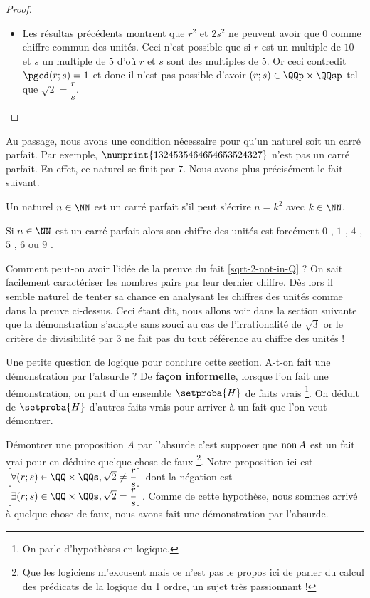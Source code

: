 \begin{proof}
\begin{itemize}[label=\small\textbullet]
		\item Les résultas précédents montrent que $r^2$ et $2 s^2$ ne peuvent avoir que $0$ comme chiffre commun des unités.
		Ceci n'est possible que si $r$ est un multiple de $10$ et $s$ un multiple de $5$ d'où $r$ et $s$ sont des multiples de $5$.
		Or ceci contredit $\pgcd(r ; s) = 1$ 
		et donc il n'est pas possible d'avoir $(r ; s) \in \QQp \times \QQsp$ tel que $\sqrt2 = \dfrac{r}{s}$.
	\end{itemize}
\end{proof}


Au passage, nous avons une condition nécessaire pour qu'un naturel soit un carré parfait. Par exemple, $\numprint{1324535464654653524327}$ n'est pas un carré parfait. En effet, ce naturel se finit par $7$. Nous avons plus précisément le fait suivant.


\begin{fact} \label{perfect-square-last-digit}
	Un naturel $n \in \NN$ est un carré parfait s'il peut s'écrire $n = k^2$ avec $k \in \NN$.
	
	\medskip
	
	Si $n \in \NN$ est un carré parfait alors son chiffre des unités est forcément $0$ , $1$ , $4$ , $5$  , $6$ ou $9$ .
\end{fact}


\begin{remark}
	Comment peut-on avoir l'idée de la preuve du fait \ref{sqrt-2-not-in-Q} ? 
	On sait facilement caractériser les nombres pairs par leur dernier chiffre. Dès lors il semble naturel de tenter sa chance en analysant les chiffres des unités comme dans la preuve ci-dessus.
	Ceci étant dit, nous allons voir dans la section suivante que la démonstration s'adapte sans souci au cas de l'irrationalité de $\sqrt3$ or le critère de divisibilité par $3$ ne fait pas du tout référence au chiffre des unités !
\end{remark}


\begin{remark}
	Une petite question de logique pour conclure cette section.
	A-t-on fait une démonstration par l'absurde ? 
	De \textbf{façon informelle}, lorsque l'on fait une démonstration, on part d'un ensemble $\setproba{H}$ de faits vrais
	\footnote{
		On parle d'hypothèses en logique.
	}.
	On déduit de $\setproba{H}$ d'autres faits vrais pour arriver à un fait que l'on veut démontrer.
	
	\smallskip
	
	Démontrer une proposition $A$ par l'absurde c'est supposer que $\text{\normalfont non \!} A$ est un fait vrai pour en déduire quelque chose de faux
	\footnote{
		Que les logiciens m'excusent mais ce n'est pas le propos ici de parler du calcul des prédicats de la logique du 1\ier{} ordre, un sujet très passionnant !
	}.
	Notre proposition ici est
	$\left[ \forall (r ; s) \in \QQ \times \QQs , \sqrt2 \neq \dfrac{r}{s} \right]$
	dont la négation est 
	$\left[ \exists (r ; s) \in \QQ \times \QQs , \sqrt2 = \dfrac{r}{s} \right]$.
	Comme de cette hypothèse, nous sommes arrivé à quelque chose de faux, nous avons fait une démonstration par l'absurde.	
\end{remark}

